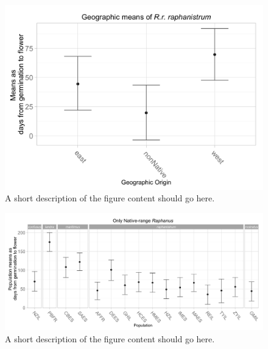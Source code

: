 \documentclass[twocolumn]{bmcart}%
\begin{document}
\begin{backmatter}
\begin{figure}[p]
  \includegraphics[width=\linewidth]{Figures/PlotRrrMeans-1.png}
  \caption{
      A short description of the figure content
      should go here.}
      \end{figure}

\begin{figure}[p]
  \includegraphics[width=\linewidth]{Figures/PlotNatPopMeans-1.png}
  \caption{
      A short description of the figure content
      should go here.}
      \end{figure}


\end{backmatter}
\end{document}
